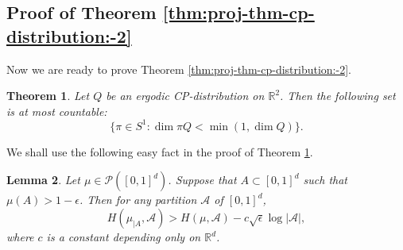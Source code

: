\documentclass[a4paper,11pt]{amsart}
\newtheorem{theorem}{Theorem}[section]
\newtheorem{lemma}[theorem]{Lemma}
\theoremstyle{definition}
\numberwithin{equation}{section}
\def\cP{\mathcal P}
\def\R{\mathbb R}
\begin{document}
\subsection{Proof of Theorem \ref{thm:proj-thm-cp-distribution:-2}}\label{subsection: proof-of-proj-theorem-cp-dist:1}

Now we are ready to prove Theorem  \ref{thm:proj-thm-cp-distribution:-2}.
\begin{theorem}\label{thm:proj-cp-distribution:1}
Let $Q$ be an ergodic CP-distribution on $\R^2$. Then the following set is at most countable:
\begin{equation}\label{eq:thm:proj-cp-distribution:1}
\{ \pi\in S^1: \dim\pi Q < \min(1,\dim Q)\}.
\end{equation}
\end{theorem}
We shall use the following easy fact in the proof of Theorem \ref{thm:proj-cp-distribution:1}.
\begin{lemma}\label{lemma:entropy of restricted meas-small delete}
Let $\mu\in \cP([0,1]^d)$. Suppose that $A\subset [0,1]^d$ such that $\mu(A)>1-\epsilon$. Then for any partition $\mathcal{A}$ of $[0,1]^d$,
\[
H(\mu_{|A},\mathcal{A}) >  H(\mu,\mathcal{A})-c\sqrt{\epsilon}\log |\mathcal{A}|,
\]
where $c$ is a constant depending only on $\R^d$.
\end{lemma}
\end{document}
